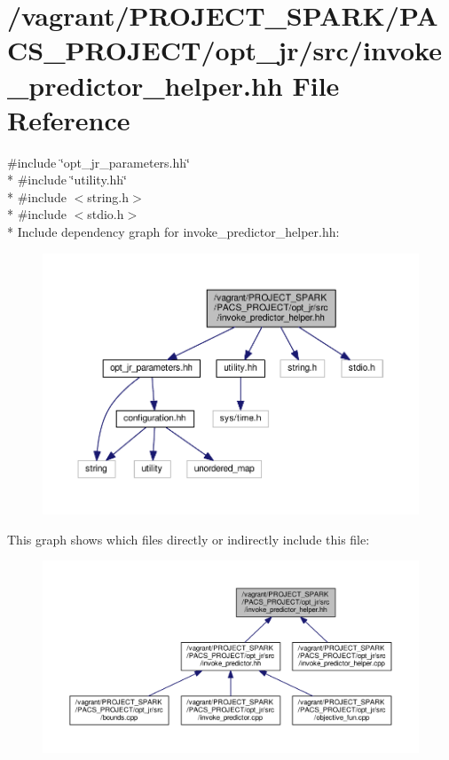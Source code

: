 \hypertarget{invoke__predictor__helper_8hh}{\section{/vagrant/\-P\-R\-O\-J\-E\-C\-T\-\_\-\-S\-P\-A\-R\-K/\-P\-A\-C\-S\-\_\-\-P\-R\-O\-J\-E\-C\-T/opt\-\_\-jr/src/invoke\-\_\-predictor\-\_\-helper.hh File Reference}
\label{invoke__predictor__helper_8hh}
}
{\ttfamily \#include \char`\"{}opt\-\_\-jr\-\_\-parameters.\-hh\char`\"{}}\\*
{\ttfamily \#include \char`\"{}utility.\-hh\char`\"{}}\\*
{\ttfamily \#include $<$string.\-h$>$}\\*
{\ttfamily \#include $<$stdio.\-h$>$}\\*
Include dependency graph for invoke\-\_\-predictor\-\_\-helper.\-hh\-:
\nopagebreak
\begin{figure}[H]
\begin{center}
\leavevmode
\includegraphics[width=350pt]{invoke__predictor__helper_8hh__incl}
\end{center}
\end{figure}
This graph shows which files directly or indirectly include this file\-:
\nopagebreak
\begin{figure}[H]
\begin{center}
\leavevmode
\includegraphics[width=350pt]{invoke__predictor__helper_8hh__dep__incl}
\end{center}
\end{figure}
